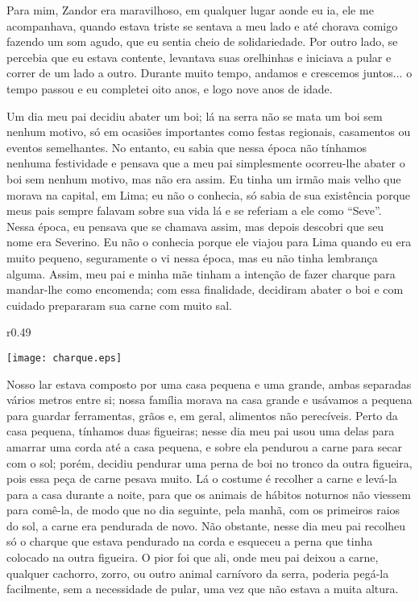 Para mim, Zandor era maravilhoso, em qualquer lugar aonde eu ia, ele me acompanhava, quando estava triste se sentava a meu lado e até chorava comigo fazendo um som agudo, que eu sentia cheio de solidariedade. 
Por outro lado, se percebia que eu estava contente, levantava suas orelhinhas e iniciava a pular e correr de um lado a outro. 
Durante muito tempo, andamos e crescemos juntos... o tempo passou e eu completei oito anos, e logo nove anos de idade.

Um dia meu pai decidiu abater um boi; lá na serra não se mata um boi sem nenhum motivo, só em ocasiões importantes como festas regionais, casamentos ou eventos semelhantes. 
No entanto, eu sabia que nessa época não tínhamos nenhuma festividade e pensava que a meu pai simplesmente ocorreu-lhe abater o boi sem nenhum motivo, mas não era assim. 
Eu tinha um irmão mais velho que morava na capital, em Lima; eu não o conhecia, só sabia de sua existência porque meus pais sempre falavam sobre sua vida lá e se referiam a ele como ``Seve''. 
Nessa época, eu pensava que se chamava assim, mas depois descobri que seu nome era Severino. 
Eu não o conhecia porque ele viajou para Lima quando eu era muito pequeno, seguramente o vi nessa época, mas eu não tinha lembrança alguma. 
Assim, meu pai e minha mãe tinham a intenção de fazer charque para mandar-lhe como encomenda; 
com essa finalidade, decidiram abater o boi e com cuidado prepararam sua carne com muito sal.

\ifdefined\EnableIncludeImages
\begin{wrapfigure}{r}{0.49\textwidth}
  \begin{center}
  \vspace{-20pt}
    \texttt{[image: charque.eps]}
  \end{center}
  \vspace{-20pt}
\end{wrapfigure}
\fi
Nosso lar estava composto por uma casa pequena e uma grande, ambas separadas vários metros entre si; nossa família morava na casa grande e usávamos a pequena para guardar ferramentas, grãos e, em geral, alimentos não perecíveis. 
Perto da casa pequena, tínhamos duas figueiras; nesse dia meu pai usou uma delas para amarrar uma corda até a casa pequena, e sobre ela pendurou a carne para secar com o sol; porém, decidiu pendurar uma perna de boi no tronco da outra figueira, pois essa peça de carne pesava muito.
Lá o costume é recolher a carne e levá-la para a casa durante a noite, para que os animais de hábitos noturnos não viessem para comê-la, de modo que no dia seguinte, pela manhã, com os primeiros raios do sol, a carne era pendurada de novo. 
Não obstante, nesse dia meu pai recolheu só o charque que estava pendurado na corda e esqueceu a perna que tinha colocado na outra figueira. 
O pior foi que ali, onde meu pai deixou a carne, qualquer cachorro, zorro, ou outro animal carnívoro da serra, poderia pegá-la facilmente, sem a necessidade de pular, uma vez que não estava a muita altura.

